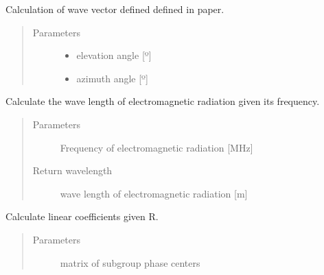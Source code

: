 \documentclass[letterpaper,10pt,english]{sphinxmanual}
\begin{document}
\begin{fulllineitems}
\label{\detokenize{functions:functions.k0_cal}}
Calculation of wave vector defined defined in paper.
\begin{quote}\begin{description}
\item[{Parameters}] \leavevmode\begin{itemize}
\item {} 
 \textendash{} elevation angle {[}º{]}

\item {} 
 \textendash{} azimuth angle {[}º{]}

\end{itemize}

\end{description}\end{quote}

\end{fulllineitems}


\begin{fulllineitems}
\label{\detokenize{functions:functions.lambda_cal}}
Calculate the wave length of electromagnetic radiation given its frequency.
\begin{quote}\begin{description}
\item[{Parameters}] \leavevmode
{} \textendash{} Frequency of electromagnetic radiation {[}MHz{]}

\item[{Return wavelength}] \leavevmode
wave length of electromagnetic radiation {[}m{]}

\end{description}\end{quote}

\end{fulllineitems}


\begin{fulllineitems}
\label{\detokenize{functions:functions.linCoeff_cal}}
Calculate linear coefficients given R.
\begin{quote}\begin{description}
\item[{Parameters}] \leavevmode
{} \textendash{} matrix of subgroup phase centers

\end{description}\end{quote}

\end{fulllineitems}
\end{document}
